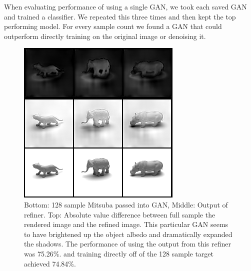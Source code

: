\documentclass[10pt,twocolumn,letterpaper]{article}
\begin{document}
When evaluating performance of using a single GAN, we took each saved GAN and trained a classifier.  We repeated this three times and then kept the top performing model.   For every sample count we found a GAN that could outperform directly training on the original image or denoising it.

\begin{figure}[h!]
\centering
\includegraphics[width=1.0\columnwidth]{./assets/128sampleGANComparison_75_26.png}
\caption{Bottom: 128 sample Mitsuba passed into GAN, Middle: Output of refiner.  Top: Absolute value difference between full sample the rendered image and the refined image. This particular GAN seems to have brightened up the object albedo and dramatically expanded the shadows.  The performance of using the output from this refiner was 75.26\%. and training directly off of the 128 sample target achieved 74.84\%.}
\label{fig:GAN_128}
\end{figure}
\end{document}
